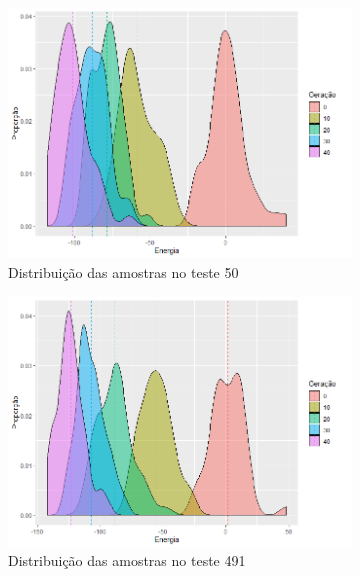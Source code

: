 \begin{figure}[ht]
	\centering
	\begin{subfigure}[b]{0.47\linewidth}
		\includegraphics[width=\linewidth]{imagens/distribuicao_t50.png}
		\caption{Distribuição das amostras no teste 50}
	\end{subfigure}
	\begin{subfigure}[b]{0.47\linewidth}
		\includegraphics[width=\linewidth]{imagens/distribuicao_t491.png}
		\caption{Distribuição das amostras no teste 491}
	\end{subfigure}
	\begin{subfigure}[b]{0.47\linewidth}

\end{subfigure}
\end{figure}
